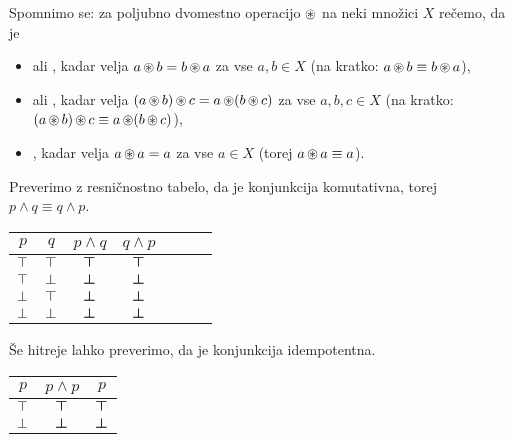                 Spomnimo se: za poljubno dvomestno operacijo $\mathop{\circledast}$ na neki množici $X$ rečemo, da je
                \begin{itemize}
                        \item
                                 ali , kadar velja $a \mathop{\circledast} b = b \mathop{\circledast} a$ za vse $a, b \in X$ (na kratko: $a \mathop{\circledast} b \equiv b \mathop{\circledast} a$),
                        \item
                                 ali , kadar velja $(a \mathop{\circledast} b) \mathop{\circledast} c = a \mathop{\circledast} (b \mathop{\circledast} c)$ za vse $a, b, c \in X$ (na kratko: $(a \mathop{\circledast} b) \mathop{\circledast} c \equiv a \mathop{\circledast} (b \mathop{\circledast} c)$),
                        \item
                                 , kadar velja $a \mathop{\circledast} a = a$ za vse $a \in X$ (torej $a \mathop{\circledast} a \equiv a$).
                \end{itemize}

                Preverimo z resničnostno tabelo, da je konjunkcija komutativna, torej $p \land q \equiv q \land p$.

                \begin{center}
                        \begin{tabular}{cc|ccccc}
                                $p$ & $q$ & $p \land q$ & $q \land p$ \\
                                \hline
                                $\top$ & $\top$ & $\bm{\top}$ & $\bm{\top}$ \\
                                $\top$ & $\bot$ & $\bm{\bot}$ & $\bm{\bot}$ \\
                                $\bot$ & $\top$ & $\bm{\bot}$ & $\bm{\bot}$ \\
                                $\bot$ & $\bot$ & $\bm{\bot}$ & $\bm{\bot}$
                        \end{tabular}
                \end{center}

                Še hitreje lahko preverimo, da je konjunkcija idempotentna.

                \begin{center}
                        \begin{tabular}{c|cc}
                                $p$ & $p \land p$ & $p$ \\
                                \hline
                                $\top$ & $\bm{\top}$ & $\bm{\top}$ \\
                                $\bot$ & $\bm{\bot}$ & $\bm{\bot}$
                        \end{tabular}
                \end{center}

